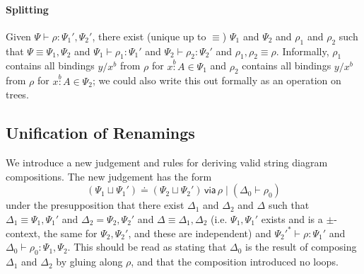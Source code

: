 \documentclass{amsart}
\let\types\vdash %
\def\cb{\mid} %
\let\mypm\pm
\def\pm{^\mypm}
\def\pms{\mypm}
\def\flip#1{#1^*} %
\newcommand\vcol[1]{\overset{\scriptscriptstyle #1}{:}}
\newcommand\combine{,}
\newcommand\combineU{\sqcup}
\newcommand{\unif}[4]{#1\doteq #2\,\mathsf{ via }\,#3\cb #4}
\begin{document}
\paragraph{Splitting} Given $\Psi \vdash \rho : \Psi_1' \combine \Psi_2'$, 
there exist (unique up to $\equiv$) $\Psi_1$ and $\Psi_2$ and $\rho_1$
and $\rho_2$ such that $\Psi \equiv \Psi_1 \combine \Psi_2$ and $\Psi_1
\vdash \rho_1 : \Psi_1'$ and $\Psi_2 \vdash \rho_2 : \Psi_2'$ and
$\rho_1 \combine \rho_2 \equiv \rho$.  Informally, $\rho_1$ contains all
bindings $y/x^b$ from $\rho$ for $x \vcol b A \in \Psi_1$ and $\rho_2$
contains all bindings $y/x^b$ from $\rho$ for $x \vcol b A \in \Psi_2$;
we could also write this out formally as an operation on trees.

\subsection{Unification of Renamings}

We introduce a new judgement and rules for deriving valid string diagram
compositions. The new judgement has the form 
\[
\unif{(\Psi_1 \combineU \Psi_1')} {(\Psi_2 \combineU \Psi_2')} {\rho} {(\Delta_0 \vdash \rho_0)}
\]
under the presupposition that there exist $\Delta_1$ and $\Delta_2$ and
$\Delta$ such that $\Delta_1 \equiv \Psi_1 \combine \Psi_1'$ and $\Delta_2 =
\Psi_2 \combine \Psi_2'$ and $\Delta \equiv \Delta_1 \combine \Delta_2$
(i.e. $\Psi_1 \combine \Psi_1'$ exists and is a $\pms$-context, the same
for $\Psi_2 \combine \Psi_2'$, and these are independent) and
$\flip{\Psi_2'} \types \rho : \Psi_1'$ and $\Delta_0 \vdash \rho_0 :
\Psi_1 \combine \Psi_2$.  This should be read as stating that $\Delta_0$
is the result of composing $\Delta_1$ and $\Delta_2$ by gluing along
$\rho$, and that the composition introduced no loops.

\end{document}
